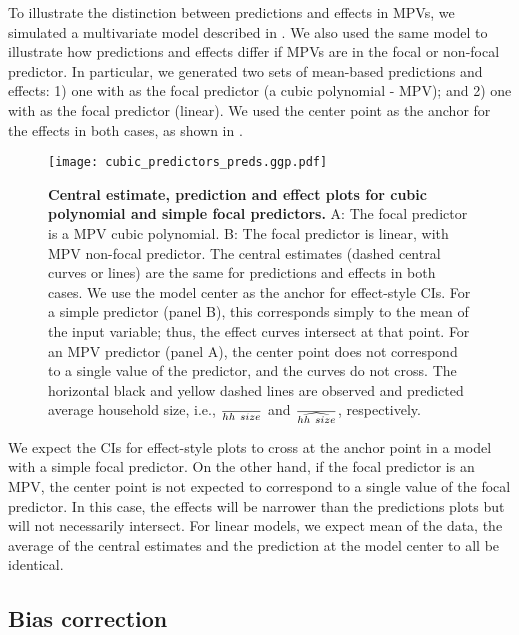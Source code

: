 To illustrate the distinction between predictions and effects in MPVs, we simulated a multivariate model described in . We also used the same model to illustrate how predictions and effects differ if MPVs are in the focal or non-focal predictor. In particular, we generated two sets of mean-based predictions and effects: 1) one with  as the focal predictor (a cubic polynomial - MPV); and 2) one with  as the focal predictor (linear). We used the center point as the anchor for the effects in both cases, as shown in .
%
\begin{figure}
\begin{center}
\texttt{[image: cubic\_predictors\_preds.ggp.pdf]}
\end{center}
\caption{{\bf Central estimate, prediction and effect plots for cubic polynomial and simple focal predictors.} A: The focal predictor is a MPV cubic polynomial. B: The focal predictor is linear, with MPV non-focal predictor. The central estimates (dashed central curves or lines) are the same for predictions and effects in both cases. We use the model center as the anchor for effect-style CIs. For a simple predictor (panel B), this corresponds simply to the mean of the input variable; thus, the effect curves intersect at that point. For an MPV predictor (panel A), the center point does not correspond to a single value of the predictor, and the curves do not cross. The horizontal black and yellow dashed lines are observed and predicted average household size, i.e., $\over{hh~size}$ and $\over{\widehat{hh~size}}$, respectively.}
\label{fig:pred_cubic_plots}
\end{figure}
%
We expect the CIs for effect-style plots to cross at the anchor point in a model with a simple focal predictor. On the other hand, if the focal predictor is an MPV, the center point is not expected to correspond to a single value of the focal predictor. In this case, the effects will be narrower than the predictions plots but will not necessarily intersect. 
For linear models, we expect mean of the data, the average of the central estimates and the prediction at the model center to all be identical. 

\subsection{Bias correction}

